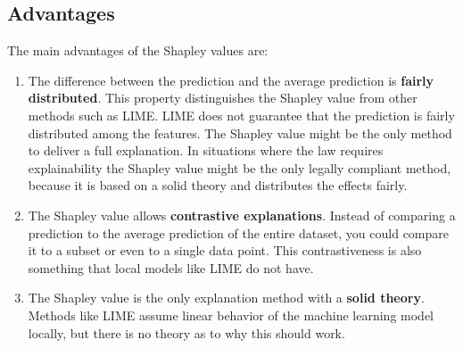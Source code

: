 \subsection{Advantages}
The main advantages of the Shapley values are:
\begin{enumerate}
    \item The difference between the prediction and the average prediction is \textbf{fairly distributed}. This property distinguishes the Shapley value from other methods such as LIME. LIME does not guarantee that the prediction is fairly distributed among the features. The Shapley value might be the only method to deliver a full explanation. In situations where the law requires explainability the Shapley value might be the only legally compliant method, because it is based on a solid theory and distributes the effects fairly.
    \item The Shapley value allows \textbf{contrastive explanations}. Instead of comparing a prediction to the average prediction of the entire dataset, you could compare it to a subset or even to a single data point. This contrastiveness is also something that local models like LIME do not have.
    \item The Shapley value is the only explanation method with a \textbf{solid theory}. Methods like LIME assume linear behavior of the machine learning model locally, but there is no theory as to why this should work.
\end{enumerate}

